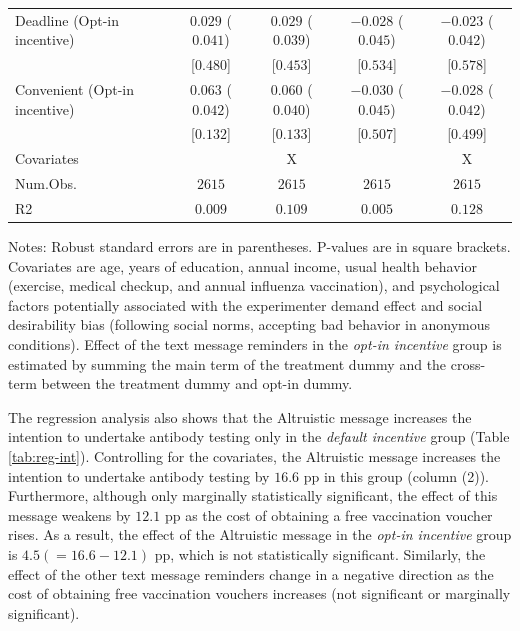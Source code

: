 \documentclass[
      12pt,
    a4paper
]{article}
\begin{document}
\begin{table}
\begin{threeparttable}
\begin{tabular}[t]{lcccc}
\hspace{1em}Deadline (Opt-in incentive) & $0.029$ ($0.041$) & $0.029$ ($0.039$) & $-0.028$ ($0.045$) & $-0.023$ ($0.042$)\\
\hspace{1em} & {}[$0.480$] & {}[$0.453$] & {}[$0.534$] & {}[$0.578$]\\
\hspace{1em}Convenient (Opt-in incentive) & $0.063$ ($0.042$) & $0.060$ ($0.040$) & $-0.030$ ($0.045$) & $-0.028$ ($0.042$)\\
\hspace{1em} & {}[$0.132$] & {}[$0.133$] & {}[$0.507$] & {}[$0.499$]\\
\midrule
Covariates &  & X &  & X\\
Num.Obs. & $2615$ & $2615$ & $2615$ & $2615$\\
R2 & $0.009$ & $0.109$ & $0.005$ & $0.128$\\
\bottomrule
\end{tabular}
\begin{tablenotes}
\item Notes: Robust standard errors are in parentheses. P-values are in square brackets. Covariates are age, years of education, annual income, usual health behavior (exercise, medical checkup, and annual influenza vaccination), and psychological factors potentially associated with the experimenter demand effect and social desirability bias (following social norms, accepting bad behavior in anonymous conditions). Effect of the text message reminders in the \emph{opt-in incentive} group is estimated by summing the main term of the treatment dummy and the cross-term between the treatment dummy and opt-in dummy.
\end{tablenotes}
\end{threeparttable}
\end{table}

The regression analysis also shows that the Altruistic message increases the intention to undertake antibody testing only in the \emph{default incentive} group (Table \ref{tab:reg-int}). Controlling for the covariates, the Altruistic message increases the intention to undertake antibody testing by \(16.6\) pp in this group (column (2)). Furthermore, although only marginally statistically significant, the effect of this message weakens by \(12.1\) pp as the cost of obtaining a free vaccination voucher rises. As a result, the effect of the Altruistic message in the \emph{opt-in incentive} group is \(4.5 (=16.6-12.1)\) pp, which is not statistically significant. Similarly, the effect of the other text message reminders change in a negative direction as the cost of obtaining free vaccination vouchers increases (not significant or marginally significant).
\end{document}
